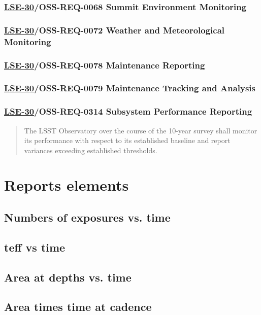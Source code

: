 \subsubsection{\href{https://ls.st/lse-30}{LSE-30}/OSS-REQ-0068 Summit Environment Monitoring}
\label{sec:org2cfd71f}
\subsubsection{\href{https://ls.st/lse-30}{LSE-30}/OSS-REQ-0072 Weather and Meteorological Monitoring}
\label{sec:orgdab84d4}
\subsubsection{\href{https://ls.st/lse-30}{LSE-30}/OSS-REQ-0078 Maintenance Reporting}
\label{sec:orgfd202b9}
\subsubsection{\href{https://ls.st/lse-30}{LSE-30}/OSS-REQ-0079 Maintenance Tracking and Analysis}
\label{sec:org9f2e42c}
\subsubsection{\href{https://ls.st/lse-30}{LSE-30}/OSS-REQ-0314 Subsystem Performance Reporting}
\label{sec:org40711d6}
\begin{quote}
The LSST Observatory over the course of the 10-year survey shall monitor its performance with respect to its established baseline and report variances exceeding established thresholds.
\end{quote}

\section{Reports elements}
\label{sec:org2064e22}
\subsection{Numbers of exposures vs. time}
\label{sec:orgaf87b39}
\subsection{teff vs time}
\label{sec:orgf7328cc}
\subsection{Area at depths vs. time}
\label{sec:org86be2ae}
\subsection{Area times time at cadence}
\label{sec:orge1d9a9b}

